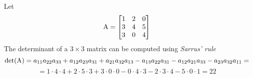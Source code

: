 \begin{example}\label{ex:det-3x3}
    Let
    $$
        \mathrm{A} = \left[\begin{matrix}
        1 & 2 & 0 \\
        3 & 4 & 5 \\
        3 & 0 & 4
        \end{matrix}\right]
    $$
    The determinant of a $3 \times 3$ matrix can be computed using \textit{Sarrus' rule}
    $$ \mathrm{det}{(\mathrm{A})} = a_{11}a_{22}a_{33} + a_{12}a_{23}a_{31} + a_{21}a_{32}a_{13} - a_{13}a_{22}a_{31} - a_{12}a_{21}a_{33} - a_{23}a_{32}a_{11} = $$
    $$ = 1 \cdot 4 \cdot 4 + 2 \cdot 5 \cdot 3 + 3 \cdot 0 \cdot 0 - 0 \cdot 4 \cdot 3 - 2 \cdot 3 \cdot 4 - 5 \cdot 0 \cdot 1 =  22 $$
\end{example}
